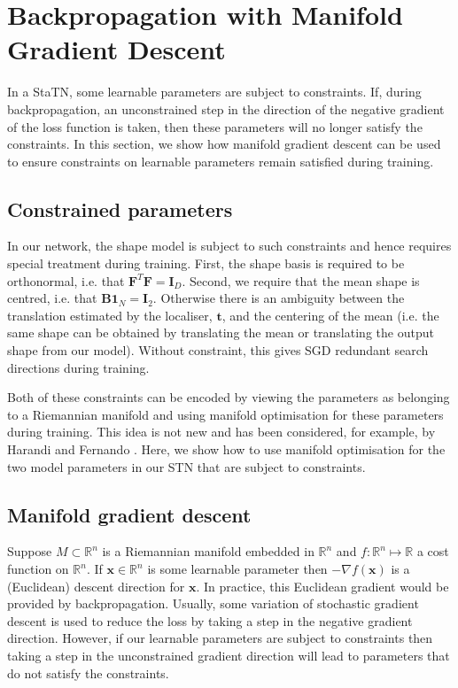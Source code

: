 \documentclass[runningheads]{llncs}
\newcommand{\R}{\mathbb{R}}
\begin{document}
\section{Backpropagation with Manifold Gradient Descent}\label{sec:manopt}

In a StaTN, some learnable parameters are subject to constraints. If, during backpropagation, an unconstrained step in the direction of the negative gradient of the loss function is taken, then these parameters will no longer satisfy the constraints. In this section, we show how manifold gradient descent can be used to ensure constraints on learnable parameters remain satisfied during training. 

\subsection{Constrained parameters}

In our network, the shape model is subject to such constraints and hence requires special treatment during training. First, the shape basis is required to be orthonormal, i.e. that $\mathbf{F}^T\mathbf{F}=\mathbf{I}_D$. Second, we require that the mean shape is centred, i.e. that $\mathbf{B1}_N=\mathbf{I}_2$. Otherwise there is an ambiguity between the translation estimated by the localiser, $\mathbf{t}$, and the centering of the mean (i.e. the same shape can be obtained by translating the mean or translating the output shape from our model). Without constraint, this gives SGD redundant search directions during training.

Both of these constraints can be encoded by viewing the parameters as belonging to a Riemannian manifold and using manifold optimisation for these parameters during training. This idea is not new and has been considered, for example, by Harandi and Fernando \cite{harandi2016generalized}. Here, we show how to use manifold optimisation for the two model parameters in our STN that are subject to constraints.

\subsection{Manifold gradient descent}

Suppose $M\subset \R^n$ is a Riemannian manifold embedded in $\R^n$ and $f:\R^n\mapsto\R$ a cost function on $\R^n$. If $\mathbf{x}\in\R^n$ is some learnable parameter then $-\nabla f(\mathbf{x})$ is a (Euclidean) descent direction for $\mathbf{x}$. In practice, this Euclidean gradient would be provided by backpropagation. Usually, some variation of stochastic gradient descent is used to reduce the loss by taking a step in the negative gradient direction. However, if our learnable parameters are subject to constraints then taking a step in the unconstrained gradient direction will lead to parameters that do not satisfy the constraints. 
\end{document}
